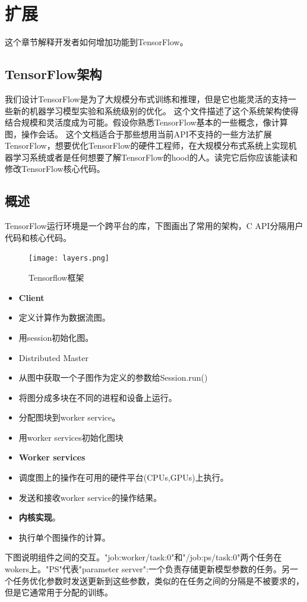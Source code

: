 \documentclass{book}
\begin{document}
\chapter{扩展}
这个章节解释开发者如何增加功能到TensorFlow。
\section{TensorFlow架构}
我们设计TensorFlow是为了大规模分布式训练和推理，但是它也能灵活的支持一些新的机器学习模型实验和系统级别的优化。
这个文件描述了这个系统架构使得结合规模和灵活度成为可能。假设你熟悉TensorFlow基本的一些概念，像计算图，操作会话。
这个文档适合于那些想用当前API不支持的一些方法扩展TensorFlow，想要优化TensorFlow的硬件工程师，在大规模分布式系统上实现机器学习系统或者是任何想要了解TensorFlow的hood的人。读完它后你应该能读和修改TensorFlow核心代码。
\section{概述}
TensorFlow运行环境是一个跨平台的库，下图画出了常用的架构，C API分隔用户代码和核心代码。
\begin{center}
\begin{figure}[H]
\centering
\texttt{[image: layers.png]}
\caption{Tensorflow框架}
	\label{fig:tf_frame}
\end{figure}
\end{center}
\begin{itemize}
\item \textbf{Client}
\item 定义计算作为数据流图。
\item 用session初始化图。
\item Distributed Master
\item 从图中获取一个子图作为定义的参数给Session.run()
\item 将图分成多块在不同的进程和设备上运行。
\item 分配图块到worker service。
\item 用worker services初始化图块
\item \textbf{Worker services}
\item 调度图上的操作在可用的硬件平台(CPUs,GPUs)上执行。
\item 发送和接收worker service的操作结果。
\item \textbf{内核实现}。
\item 执行单个图操作的计算。
\end{itemize}
下图说明组件之间的交互。"job:worker/task:0"和"/job:ps/task:0"两个任务在wokers上。"PS"代表"parameter server":一个负责存储更新模型参数的任务。另一个任务优化参数时发送更新到这些参数，类似的在任务之间的分隔是不被要求的，但是它通常用于分配的训练。
\end{document}
